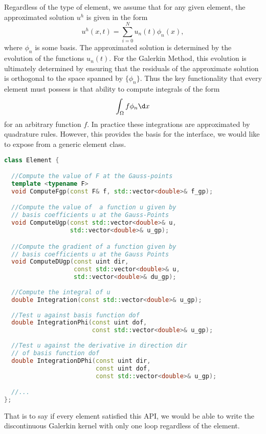Regardless of the type of element, we assume that for any given element, the approximated solution $u^h$ is given in the form
\begin{equation*}
u^h(x,t) = \sum_{i=0}^{N} u_n(t) \phi_n(x),
\end{equation*}
where $\phi_n$ is some basis. The approximated solution is determined by the evolution of the functions $u_n(t)$. For the Galerkin Method, this evolution is ultimately determined by ensuring that the residuals of the approximate solution is orthogonal to the space spanned by $\{\phi_n\}$. Thus the key functionality that every element must possess is that ability to compute integrals of the form 
\begin{equation*}
\int_{\Omega} f \phi_n \d x
\end{equation*}
for an arbitrary function $f$. In practice these integrations are approximated by quadrature rules. However, this provides the basis for the interface, we would like to expose from a generic element class.
\begin{lstlisting}[language=c++, caption={Generic Element API}]
class Element {

  //Compute the value of F at the Gauss-points
  template <typename F>
  void ComputeFgp(const F& f, std::vector<double>& f_gp);

  //Compute the value of  a function u given by
  // basis coefficients u at the Gauss-Points	    
  void ComputeUgp(const std::vector<double>& u,
                  std::vector<double>& u_gp);

  //Compute the gradient of a function given by
  // basis coefficients u at the Gauss Points    
  void ComputeDUgp(const uint dir,
                   const std::vector<double>& u,
                   std::vector<double>& du_gp);
	
  //Compute the integral of u
  double Integration(const std::vector<double>& u_gp);
	
  //Test u against basis function dof
  double IntegrationPhi(const uint dof,
                        const std::vector<double>& u_gp);
    
  //Test u against the derivative in direction dir
  // of basis function dof
  double IntegrationDPhi(const uint dir,
                         const uint dof,
                         const std::vector<double>& u_gp);

  //...
};
\end{lstlisting}
That is to say if every element satisfied this API, we would be able to write the discontinuous Galerkin kernel with only one loop regardless of the element.

